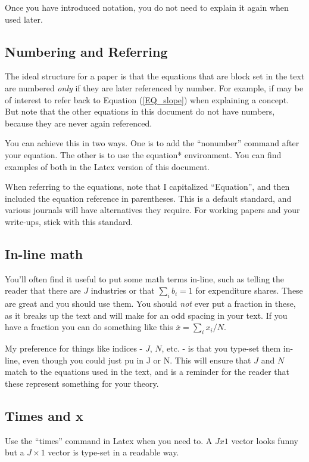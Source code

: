 \documentclass{article}
\begin{document}
Once you have introduced notation, you do not need to explain it again when used later. 

\subsection*{Numbering and Referring}
The ideal structure for a paper is that the equations that are block set in the text are numbered \textit{only} if they are later referenced by number. For example, if may be of interest to refer back to Equation (\ref{EQ_slope}) when explaining a concept. But note that the other equations in this document do not have numbers, because they are never again referenced. 

You can achieve this in two ways. One is to add the ``nonumber'' command after your equation. The other is to use the equation* environment. You can find examples of both in the Latex version of this document. 

When referring to the equations, note that I capitalized ``Equation'', and then included the equation reference in parentheses. This is a default standard, and various journals will have alternatives they require. For working papers and your write-ups, stick with this standard. 

\subsection*{In-line math}
You'll often find it useful to put some math terms in-line, such as telling the reader that there are $J$ industries or that $\sum_i b_i = 1$ for expenditure shares. These are great and you should use them. You should \textit{not} ever put a fraction in these, as it breaks up the text and will make for an odd spacing in your text. If you have a fraction you can do something like this $\overline{x} = \sum_i x_i / N$. 

My preference for things like indices - $J$, $N$, etc. - is that you type-set them in-line, even though you could just pu in J or N. This will ensure that $J$ and $N$ match to the equations used in the text, and is a reminder for the reader that these represent something for your theory. 

\subsection*{Times and x}
Use the ``times'' command in Latex when you need to. A $Jx1$ vector looks funny but a $J \times 1$ vector is type-set in a readable way. 
\end{document}
